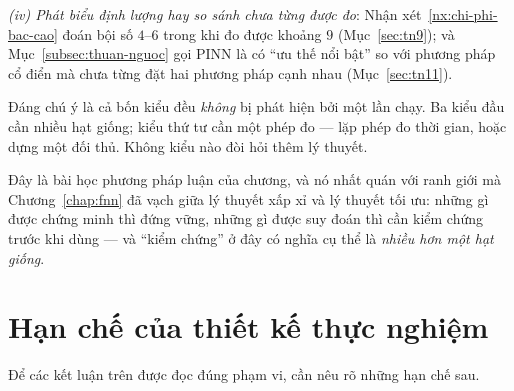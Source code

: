 \emph{(iv) Phát biểu định lượng hay so sánh chưa từng được đo}: Nhận
xét~\ref{nx:chi-phi-bac-cao} đoán bội số $4$--$6$ trong khi đo được khoảng $9$
(Mục~\ref{sec:tn9}); và Mục~\ref{subsec:thuan-nguoc} gọi PINN là có ``ưu thế nổi
bật'' so với phương pháp cổ điển mà chưa từng đặt hai phương pháp cạnh nhau
(Mục~\ref{sec:tn11}).

Đáng chú ý là cả bốn kiểu đều \emph{không} bị phát hiện bởi một lần chạy. Ba
kiểu đầu cần nhiều hạt giống; kiểu thứ tư cần một phép đo --- lặp phép đo thời
gian, hoặc dựng một đối thủ. Không kiểu nào đòi hỏi thêm lý thuyết.

Đây là bài học phương pháp luận của chương, và nó nhất quán với ranh giới mà
Chương~\ref{chap:fnn} đã vạch giữa lý thuyết xấp xỉ và lý thuyết tối ưu: những gì
được chứng minh thì đứng vững, những gì được suy đoán thì cần kiểm chứng trước khi
dùng --- và ``kiểm chứng'' ở đây có nghĩa cụ thể là \emph{nhiều hơn một hạt
giống}.
 
\section{Hạn chế của thiết kế thực nghiệm}
\label{sec:hanche}
 
Để các kết luận trên được đọc đúng phạm vi, cần nêu rõ những hạn chế sau.
 
